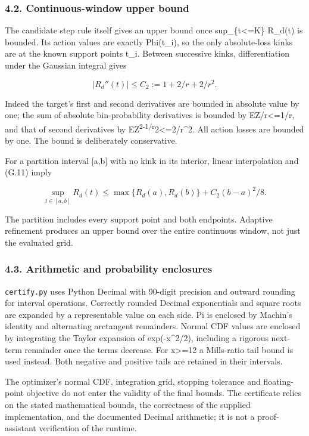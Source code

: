 \subsubsection{4.2. Continuous-window upper
bound}\label{gaussian_decision-continuous-window-upper-bound}

The candidate step rule itself gives an upper bound once
sup\_\{\textbar t\textbar\textless=K\} R\_d(t) is bounded. Its action
values are exactly Phi(t\_i), so the only absolute-loss kinks are at the
known support points t\_i. Between successive kinks, differentiation
under the Gaussian integral gives

\[
|R_d''(t)|\le C_2:=1+2/r+2/r^2.
\tag{G.11}
\]

Indeed the target's first and second derivatives are bounded in absolute
value by one; the sum of absolute bin-probability derivatives is bounded
by E\textbar Z\textbar/r\textless=1/r, and that of second derivatives by
E\textbar Z\textsuperscript{2-1\textbar/r}2\textless=2/r\^{}2. All
action losses are bounded by one. The bound is deliberately
conservative.

For a partition interval {[}a,b{]} with no kink in its interior, linear
interpolation and (G.11) imply

\[
\sup_{t\in[a,b]}R_d(t)
\le\max\{R_d(a),R_d(b)\}+C_2(b-a)^2/8.
\tag{G.12}
\]

The partition includes every support point and both endpoints. Adaptive
refinement produces an upper bound over the entire continuous window,
not just the evaluated grid.

\subsubsection{4.3. Arithmetic and probability
enclosures}\label{gaussian_decision-arithmetic-and-probability-enclosures}

\texttt{certify.py} uses Python Decimal with 90-digit precision and
outward rounding for interval operations. Correctly rounded Decimal
exponentials and square roots are expanded by a representable value on
each side. Pi is enclosed by Machin's identity and alternating
arctangent remainders. Normal CDF values are enclosed by integrating the
Taylor expansion of exp(-x\^{}2/2), including a rigorous next-term
remainder once the terms decrease. For \textbar x\textbar\textgreater=12
a Mills-ratio tail bound is used instead. Both negative and positive
tails are retained in their intervals.

The optimizer's normal CDF, integration grid, stopping tolerance and
floating-point objective do not enter the validity of the final bounds.
The certificate relies on the stated mathematical bounds, the
correctness of the supplied implementation, and the documented Decimal
arithmetic; it is not a proof-assistant verification of the runtime.

